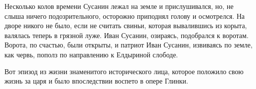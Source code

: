 Несколько колов времени Сусанин лежал на земле и прислушивался, но, не слыша ничего подозрительного, осторожно приподнял голову и осмотрелся. На дворе никого не было, если не считать свиньи, которая вывалившись из корыта, валялась теперь в грязной луже. Иван Сусанин, озираясь, подобрался к воротам. Ворота, по счастью, были открыты, и патриот Иван Сусанин, извиваясь по земле, как червь, пополз по направлению к Елдыриной слободе.

Вот эпизод из жизни знаменитого исторического лица, которое положило свою жизнь за царя и было впоследствии воспето в опере Глинки.
